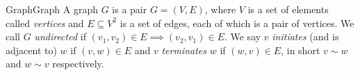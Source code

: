 \begin{mdef}{Graph}{Graph}
    A graph $G$ is a pair $G = (V,E)$, where $V$ is a set of elements called \emph{vertices} and $E\subseteq V^2$ is a set of edges, each of which is a pair of vertices. We call $G$ \emph{undirected} if $(v_1,v_2)\in E \implies (v_2,v_1)\in E$. We say $v$ \emph{initiates} (and is adjacent to) $w$ if $(v,w)\in E$ and $v$ \emph{terminates} $w$ if $(w,v)\in E$, in short $v\sim w$ and $w\sim v$ respectively.
\end{mdef}